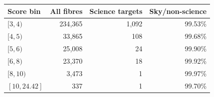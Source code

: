 \begin{ruledtabular}
\begin{tabular}{l r r r}
Score bin & All fibres & Science targets & Sky/non-science \\
\hline
$[3,4)$ & 234{,}365 & 1{,}092 & 99.53\% \\
$[4,5)$ & 33{,}865 & 108 & 99.68\% \\
$[5,6)$ & 25{,}008 & 24 & 99.90\% \\
$[6,8)$ & 23{,}370 & 18 & 99.92\% \\
$[8,10)$ & 3{,}473 & 1 & 99.97\% \\
$[10,24.42]$ & 337 & 1 & 99.70\% \\
\end{tabular}
\end{ruledtabular}
